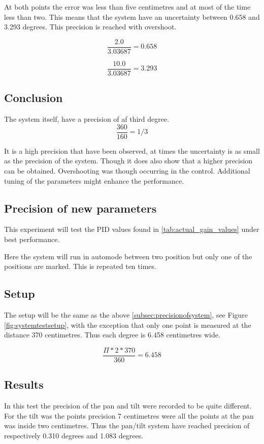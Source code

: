 At both points the error was less than five centimetres and at most of the time
less than two. This means that the system have an uncertainty between 0.658 and
3.293 degrees. This precision is reached with overshoot.

\[ \frac{2.0}{3.03687} = 0.658 \]

\[ \frac{10.0}{3.03687} = 3.293 \]

\subsection*{Conclusion}

The system itself, have a precision of af third degree.
\[ \frac{360}{160} = 1/3 \]

It is a high precision that have been observed, at times the uncertainty is as
small as the precision of the system. Though it does also show that a higher
precision can be obtained. Overshooting was though occurring in the control.
Additional tuning of the parameters might enhance the performance.

\subsection{Precision of new parameters}\label{sec:precisionofsystem2}

This experiment will test the PID values found in \ref{tab:actual_gain_values}
under best performance.

Here the system will run in automode between two position but only one of the
positions are marked. This is repeated ten times.

\subsection*{Setup}

The setup will be the same as the above \ref{subsec:precisionofsystem}, see
Figure \ref{fig:systemtestsetup}, with the exception that only one point is measured at
the distance 370 centimetres. Thus each degree is 6.458 centimetres wide.

\[ \frac{\Pi*2*370}{360} = 6.458 \]

\subsection*{Results}

In this test the precision of the pan and tilt were recorded to be quite
different. For the tilt was the points precision 7 centimetres were all the
points at the pan was inside two centimetres. Thus the pan/tilt system have
reached precision of respectively 0.310 degrees and 1.083 degrees.


